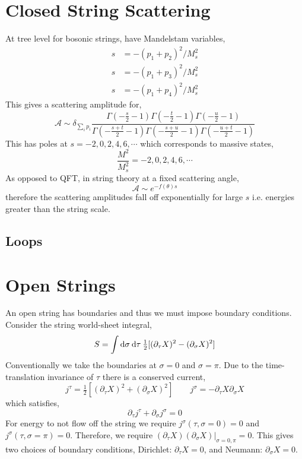\documentclass[12pt]{extarticle}
\begin{document}
\section{Closed String Scattering}

At tree level for bosonic strings, have Mandelstam variables,
\begin{align*}
s & = - (p_1 + p_2)^2 / M_s^2
\\
s & = - (p_1 + p_3)^2 / M_s^2
\\
s & = - (p_1 + p_4)^2 / M_s^2
\end{align*}
This gives a scattering amplitude for,
\[ \mathcal{A} \sim \delta_{\sum_i p_i} \frac{\Gamma\left( - \tfrac{s}{2} - 1 \right) \Gamma\left( - \tfrac{t}{2} - 1 \right) \Gamma\left( - \tfrac{u}{2} - 1 \right)}{\Gamma\left( - \tfrac{s+t}{2} - 1 \right)\Gamma\left( - \tfrac{s+u}{2} - 1 \right)\Gamma\left( - \tfrac{u+t}{2} - 1 \right)} \]
This has poles at $s = -2,0,2,4,6, \cdots$ which corresponds to massive states,
\[ \frac{M^2}{M_s^2} = -2,0,2,4,6, \cdots \]
As opposed to QFT, in string theory at a fixed scattering angle,
\[ \mathcal{A} \sim e^{-f(\theta) s} \]
therefore the scattering amplitudes fall off exponentially for large $s$ i.e. energies greater than the string scale. 

\subsection{Loops}


\section{Open Strings}

An open string has boundaries and thus we must impose boundary conditions. Consider the string world-sheet integral,
\[ S = \int \mathrm{d}\sigma \: \mathrm{d}\tau \: \tfrac{1}{2} [(\partial_\tau X)^2 - (\partial_\sigma X)^2 ] \]
Conventionally we take the boundaries at $\sigma = 0$ and $\sigma = \pi$. Due to the time-translation invariance of $\tau$ there is a conserved current,
\[ j^\tau = \tfrac{1}{2} [ (\partial_\tau X)^2 + (\partial_\sigma X)^2 ] \quad \quad j^\sigma = - \partial_\tau X \partial_\sigma X \]
which satisfies,
\[ \partial_\tau j^\tau + \partial_\sigma j^\sigma = 0 \]
For energy to not flow off the string we require $j^\sigma(\tau, \sigma = 0) = 0$ and $j^\sigma(\tau, \sigma = \pi) = 0$. Therefore, we require $(\partial_\tau X) (\partial_\sigma X) |_{\sigma = 0, \pi} = 0$. This gives two choices of boundary conditions, Dirichlet: $\partial_\tau X = 0$, and Neumann: $\partial_\sigma X = 0$. 
\end{document}
